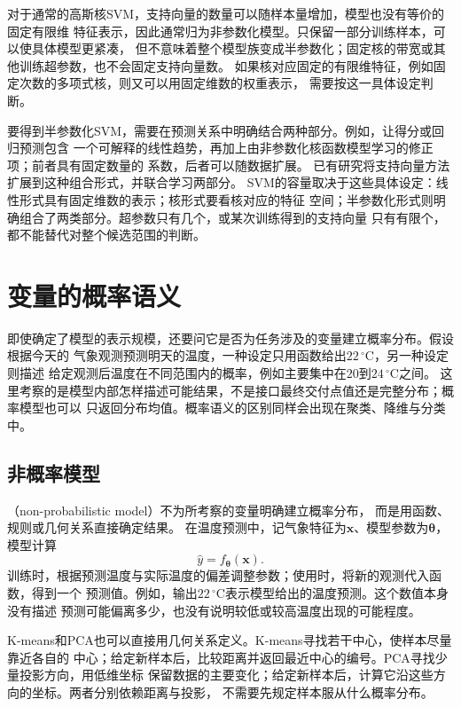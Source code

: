 对于通常的高斯核SVM，支持向量的数量可以随样本量增加，模型也没有等价的固定有限维
特征表示，因此通常归为非参数化模型。只保留一部分训练样本，可以使具体模型更紧凑，
但不意味着整个模型族变成半参数化；固定核的带宽或其他训练超参数，也不会固定支持向量数。
如果核对应固定的有限维特征，例如固定次数的多项式核，则又可以用固定维数的权重表示，
需要按这一具体设定判断。

要得到半参数化SVM，需要在预测关系中明确结合两种部分。例如，让得分或回归预测包含
一个可解释的线性趋势，再加上由非参数化核函数模型学习的修正项；前者具有固定数量的
系数，后者可以随数据扩展。
已有研究将支持向量方法扩展到这种组合形式，并联合学习两部分。
SVM的容量取决于这些具体设定：线性形式具有固定维数的表示；核形式要看核对应的特征
空间；半参数化形式则明确组合了两类部分。超参数只有几个，或某次训练得到的支持向量
只有有限个，都不能替代对整个候选范围的判断。

\section{变量的概率语义}
\label{sec:models-probability}

即使确定了模型的表示规模，还要问它是否为任务涉及的变量建立概率分布。假设根据今天的
气象观测预测明天的温度，一种设定只用函数给出$22\,^{\circ}\mathrm{C}$，另一种设定则描述
给定观测后温度在不同范围内的概率，例如主要集中在$20$到$24\,^{\circ}\mathrm{C}$之间。
这里考察的是模型内部怎样描述可能结果，不是接口最终交付点值还是完整分布；概率模型也可以
只返回分布均值。概率语义的区别同样会出现在聚类、降维与分类中。

\subsection{非概率模型}
\label{sec:models-nonprobabilistic}

（non-probabilistic model）不为所考察的变量明确建立概率分布，
而是用函数、规则或几何关系直接确定结果。
在温度预测中，记气象特征为$\bm{x}$、模型参数为$\bm{\theta}$，模型计算
\begin{equation}
  \hat{y}=f_{\bm{\theta}}(\bm{x}).
  \label{eq:models-point-prediction}
\end{equation}
训练时，根据预测温度与实际温度的偏差调整参数；使用时，将新的观测代入函数，得到一个
预测值。例如，输出$22\,^{\circ}\mathrm{C}$表示模型给出的温度预测。这个数值本身没有描述
预测可能偏离多少，也没有说明较低或较高温度出现的可能程度。

K-means和PCA也可以直接用几何关系定义。K-means寻找若干中心，使样本尽量靠近各自的
中心；给定新样本后，比较距离并返回最近中心的编号。PCA寻找少量投影方向，用低维坐标
保留数据的主要变化；给定新样本后，计算它沿这些方向的坐标。两者分别依赖距离与投影，
不需要先规定样本服从什么概率分布。

